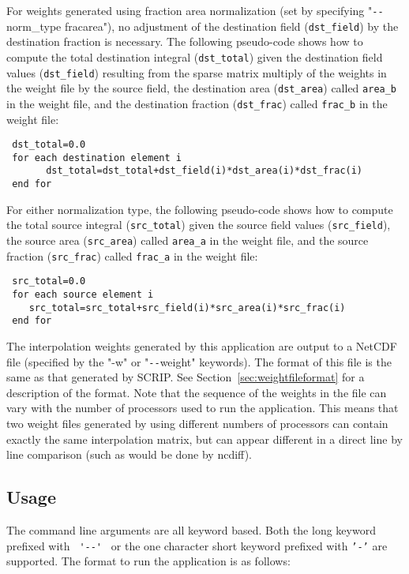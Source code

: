 For weights generated using fraction area normalization (set by specifying "\verb+--+norm\_type fracarea"), no adjustment of the destination field ({\tt dst\_field}) by the destination fraction is necessary. The following pseudo-code shows how to compute the total destination integral ({\tt dst\_total}) given the destination field values ({\tt dst\_field}) resulting
from the sparse matrix multiply of the weights in the weight file by the source field, the destination area ({\tt dst\_area}) called {\tt area\_b} in the
weight file, and the destination fraction ({\tt dst\_frac}) called {\tt frac\_b} in the weight file: 

\begin{verbatim}
 dst_total=0.0
 for each destination element i
       dst_total=dst_total+dst_field(i)*dst_area(i)*dst_frac(i)
 end for
\end{verbatim}

For either normalization type, the following pseudo-code shows how to compute the total source integral ({\tt src\_total}) given the source field values ({\tt src\_field}), the source area ({\tt src\_area}) called {\tt area\_a} in the weight file, and the source fraction ({\tt src\_frac}) called {\tt frac\_a} in the weight file:

\begin{verbatim}
 src_total=0.0
 for each source element i
    src_total=src_total+src_field(i)*src_area(i)*src_frac(i)
 end for
\end{verbatim}


The interpolation weights generated by this application are output to a NetCDF file (specified by the "-w" or "\verb+--+weight"
keywords). The format of this file is the same as that generated by SCRIP. See Section~\ref{sec:weightfileformat} for a description of the format.
Note that the sequence of the weights in the file can
vary with the number of processors used to run the application. This means that two weight files generated by using different
numbers of processors can contain exactly the same interpolation matrix, but can appear different in a direct line by line
comparison (such as would be done by ncdiff).

\subsection{Usage}\label{sec:regridusage}

The command line arguments are all keyword based.  Both the long keyword prefixed with \verb+ '--' + or the
one character short keyword prefixed with {\tt '-'} are supported.  The format to run the application is
as follows:

